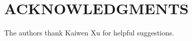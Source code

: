 \documentclass[letterpaper, 10 pt, conference]{ieeeconf}  %
\begin{document}











\section*{ACKNOWLEDGMENTS}

The authors thank Kaiwen Xu for helpful suggestions. 


\end{document}
